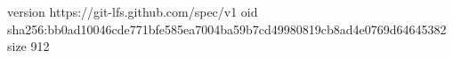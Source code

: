 version https://git-lfs.github.com/spec/v1
oid sha256:bb0ad10046cde771bfe585ea7004ba59b7cd49980819cb8ad4e0769d64645382
size 912
